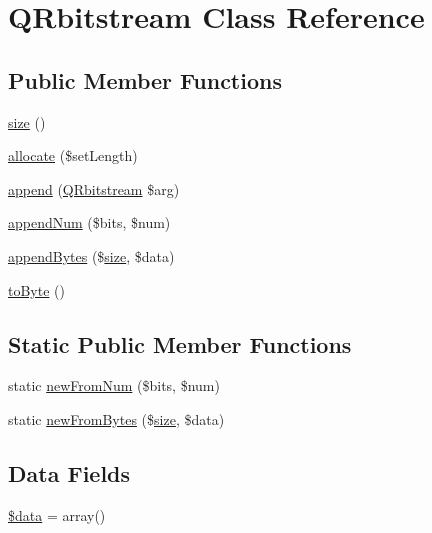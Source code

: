 \hypertarget{class_q_rbitstream}{\section{Q\-Rbitstream Class Reference}
\label{class_q_rbitstream}
}
\subsection*{Public Member Functions}
\begin{DoxyCompactItemize}
\item 
\hyperlink{class_q_rbitstream_a775bfb88c1bb7975d67f277eade2a1b7}{size} ()
\item 
\hyperlink{class_q_rbitstream_adc9952419d09d0d0afedfacd4471433f}{allocate} (\$set\-Length)
\item 
\hyperlink{class_q_rbitstream_a75000673a2a1620408fbf91ccc31e7b0}{append} (\hyperlink{class_q_rbitstream}{Q\-Rbitstream} \$arg)
\item 
\hyperlink{class_q_rbitstream_a99b3b6b2a865deb3d1945aebd07c3bf3}{append\-Num} (\$bits, \$num)
\item 
\hyperlink{class_q_rbitstream_acca7cd6db4b1ff6eddf243ccb3d90b9b}{append\-Bytes} (\$\hyperlink{class_q_rbitstream_a775bfb88c1bb7975d67f277eade2a1b7}{size}, \$data)
\item 
\hyperlink{class_q_rbitstream_a084c4c03b3b0c907ce584eac4eecd475}{to\-Byte} ()
\end{DoxyCompactItemize}
\subsection*{Static Public Member Functions}
\begin{DoxyCompactItemize}
\item 
static \hyperlink{class_q_rbitstream_a7d553d41faeb9fed6099a106f9ad64da}{new\-From\-Num} (\$bits, \$num)
\item 
static \hyperlink{class_q_rbitstream_a233d5da4c0c11b8dbda14d10349e55e2}{new\-From\-Bytes} (\$\hyperlink{class_q_rbitstream_a775bfb88c1bb7975d67f277eade2a1b7}{size}, \$data)
\end{DoxyCompactItemize}
\subsection*{Data Fields}
\begin{DoxyCompactItemize}
\item 
\hyperlink{class_q_rbitstream_a6efc15b5a2314dd4b5aaa556a375c6d6}{\$data} = array()
\end{DoxyCompactItemize}


